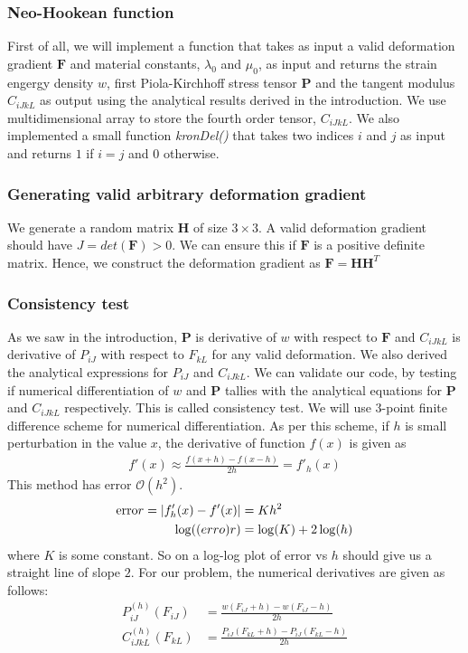 \documentclass[../main.tex]{subfiles}
\begin{document}
\subsubsection{Neo-Hookean function}
First of all, we will implement a function that takes as input a valid
deformation gradient $\mathbf{F}$ and material constants, $\lambda_0$
and $\mu_0$, as input and returns the strain engergy density $w$,
first Piola-Kirchhoff stress tensor $\mathbf{P}$ and the tangent
modulus $C_{iJkL}$ as output using the analytical results derived in
the introduction. We use multidimensional array to store the fourth
order tensor, $C_{iJkL}$. We also implemented a small function
\textit{kronDel()} that takes two indices $i$ and $j$ as input and
returns $1$ if $i=j$ and $0$ otherwise.
\subsubsection{Generating valid arbitrary deformation gradient}
We generate a random matrix $\mathbf{H}$ of size $3\times 3$. A valid
deformation gradient should have $J = det(\mathbf{F}) > 0$. We can
ensure this if $\mathbf{F}$ is a positive definite matrix. Hence, we
construct the deformation gradient as $\mathbf{F} = \mathbf{HH}^T$
\subsubsection{Consistency test}
\label{sec:consistency}
As we saw in the introduction, $\mathbf{P}$ is derivative of $w$ with
respect to $\mathbf{F}$ and $C_{iJkL}$ is derivative of $P_{iJ}$ with
respect to $F_{kL}$ for any valid deformation. We also derived the
analytical expressions for $P_{iJ}$ and $C_{iJkL}$. We can validate
our code, by testing if numerical differentiation of $w$ and
$\mathbf{P}$ tallies with the analytical equations for $\mathbf{P}$
and $C_{iJkL}$ respectively. This is called consistency test.  We will
use 3-point finite difference scheme for numerical differentiation. As
per this scheme, if $h$ is small perturbation in the value $x$, the
derivative of function $f(x)$ is given as
\begin{align*}
  f'(x) \approx \frac{f(x+h)-f(x-h)}{2h} = f'_h(x)
\end{align*}
This method has error $\mathcal{O}(h^2)$.
\begin{align*}
  \text{erro}r = |f'_h(x) - f'(x)| &= Kh^2\\
  \log(\text(erro)r) &= \log(K) + 2\log(h)\\
\end{align*}
where $K$ is some constant. So on a log-log plot of $\text{error}$ vs
$h$ should give us a straight line of slope $2$.  For our problem, the
numerical derivatives are given as follows:
\begin{align*}
  P^{(h)}_{iJ}(F_{iJ}) &= \frac{w(F_{iJ}+h) - w(F_{iJ}-h)}{2h}\\
  C^{(h)}_{iJkL}(F_{kL})&=\frac{P_{iJ}(F_{kL}+h) - P_{iJ}(F_{kL}-h)}{2h}\\
\end{align*}
\end{document}
